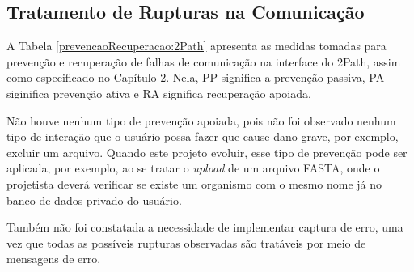 \subsection{Tratamento de Rupturas na Comunicação}

\indent A Tabela \ref{prevencaoRecuperacao:2Path} apresenta as medidas tomadas para prevenção e recuperação de falhas de comunicação na interface do 2Path, assim como especificado no Capítulo 2. Nela, PP significa a prevenção passiva, PA siginifica prevenção ativa e RA significa recuperação apoiada. 

\indent Não houve nenhum tipo de prevenção apoiada, pois não foi observado nenhum tipo de interação que o usuário possa fazer que cause dano grave, por exemplo, excluir um arquivo. Quando este projeto evoluir, esse tipo de prevenção pode ser aplicada, por exemplo, ao se tratar o \textit{upload} de um arquivo FASTA, onde o projetista deverá verificar se existe um organismo com o mesmo nome já no banco de dados privado do usuário. 

\indent Também não foi constatada a necessidade de implementar captura de erro, uma vez que todas as possíveis rupturas observadas são tratáveis por meio de mensagens de erro.

